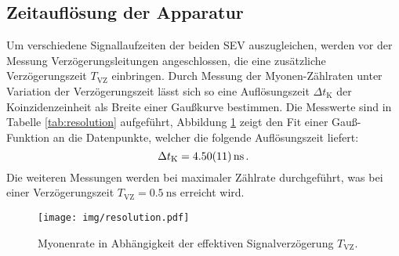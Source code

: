 \subsection{Zeitauflösung der Apparatur}
\label{subsec:zeitaufloesung}
Um verschiedene Signallaufzeiten der beiden SEV auszugleichen, werden vor der
Messung Verzögerungsleitungen angeschlossen, die eine zusätzliche
Verzögerungszeit $T_\text{VZ}$ einbringen.
Durch Messung der Myonen-Zählraten unter Variation der Verzögerungszeit
lässt sich so eine Auflösungszeit $\Delta t_\text{K}$ der Koinzidenzeinheit
als Breite einer Gaußkurve bestimmen.
Die Messwerte sind in Tabelle \ref{tab:resolution} aufgeführt, Abbildung
\ref{fig:resolution} zeigt den Fit einer Gauß-Funktion an die Datenpunkte,
welcher die folgende Auflösungszeit liefert:
\begin{equation*}
    \Delta t_\text{K} = \SI{4.50+-0.11}{\nano \second}\,.
\end{equation*}
Die weiteren Messungen werden bei maximaler Zählrate durchgeführt, was bei
einer Verzögerungszeit $T_\text{VZ} = \SI{0.5}{\nano \second}$ erreicht wird.
\begin{figure}[htb]
    \centering
    \texttt{[image: img/resolution.pdf]}
    \caption{
        Myonenrate in Abhängigkeit der effektiven Signalverzögerung
        $T_\text{VZ}$.
    }
    \label{fig:resolution}
\end{figure}
